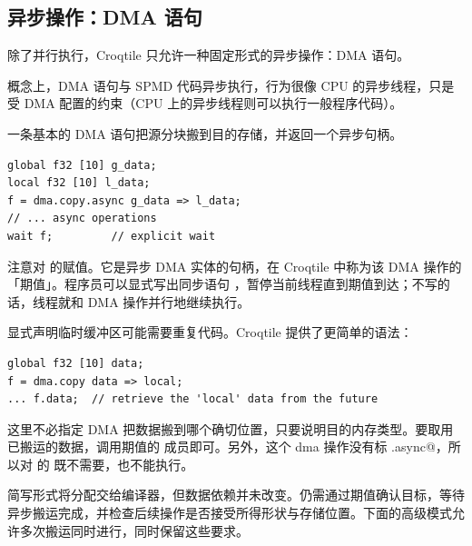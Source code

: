 \subsection*{异步操作：DMA 语句}

除了并行执行，Croqtile 只允许一种固定形式的异步操作：DMA 语句。

概念上，DMA 语句与 SPMD 代码异步执行，行为很像 CPU 的异步线程，只是受 DMA 配置的约束（CPU 上的异步线程则可以执行一般程序代码）。

一条基本的 DMA 语句把源分块搬到目的存储，并返回一个异步句柄。

\begin{lstlisting}[language=croqtile,caption={一个异步 DMA 声明}]
global f32 [10] g_data;
local f32 [10] l_data;
f = dma.copy.async g_data => l_data;
// ... async operations
wait f;         // explicit wait
\end{lstlisting}

注意对 \co@f@ 的赋值。它是异步 DMA 实体的句柄，在 Croqtile 中称为该 DMA 操作的「期值」。程序员可以显式写出同步语句 \co@wait@，暂停当前线程直到期值到达；不写的话，线程就和 DMA 操作并行地继续执行。

显式声明临时缓冲区可能需要重复代码。Croqtile 提供了更简单的语法：

\begin{lstlisting}[language=croqtile,caption={带存储的同一种声明}]
global f32 [10] data;
f = dma.copy data => local;
... f.data;  // retrieve the 'local' data from the future
\end{lstlisting}

这里不必指定 DMA 把数据搬到哪个确切位置，只要说明目的内存类型。要取用已搬运的数据，调用期值的 \co@data@ 成员即可。另外，这个 dma 操作没有标 \co@.async@，所以对 \co@f@ 的 \co@wait@ 既不需要，也不能执行。

简写形式将分配交给编译器，但数据依赖并未改变。仍需通过期值确认目标，等待异步搬运完成，并检查后续操作是否接受所得形状与存储位置。下面的高级模式允许多次搬运同时进行，同时保留这些要求。
